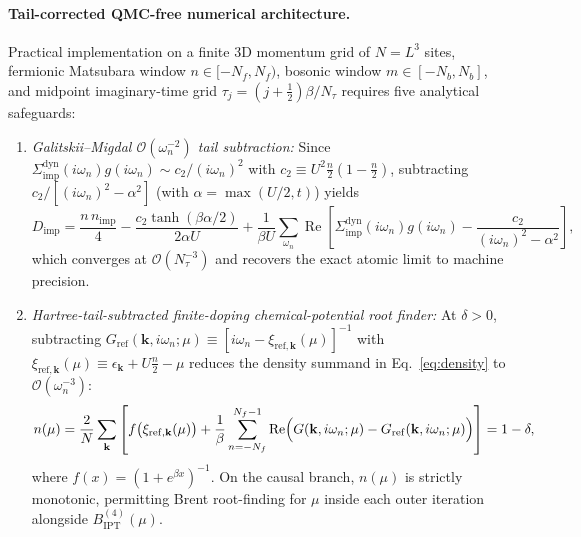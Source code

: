 \documentclass[11pt,a4paper]{article}
\numberwithin{equation}{section}
\theoremstyle{plain}
\theoremstyle{definition}
\providecommand{\vk}{\mathbf{k}}
\providecommand{\re}{\operatorname{Re}}
\begin{document}
\paragraph{Tail-corrected QMC-free numerical architecture.}
Practical implementation on a finite 3D momentum grid of $N = L^3$ sites, fermionic
Matsubara window $n \in [-N_f, N_f)$, bosonic window $m \in [-N_b, N_b]$, and midpoint
imaginary-time grid $\tau_j = (j + \frac{1}{2})\beta/N_\tau$ requires five analytical
safeguards:
\begin{enumerate}
    \item \emph{Galitskii--Migdal $\mathcal{O}(\omega_n^{-2})$ tail subtraction:} Since
    $\Sigma_{\mathrm{imp}}^{\mathrm{dyn}}(i\omega_n)g(i\omega_n) \sim c_2/(i\omega_n)^2$
    with $c_2 \equiv U^2 \frac{n}{2}(1 - \frac{n}{2})$, subtracting
    $c_2/[(i\omega_n)^2 - \alpha^2]$ (with $\alpha = \max(U/2, t)$) yields
    \begin{equation}
        D_{\mathrm{imp}}
        = \frac{n\, n_{\mathrm{imp}}}{4} - \frac{c_2\tanh(\beta\alpha/2)}{2\alpha U}
          + \frac{1}{\beta U}\sum_{\omega_n} \re\!\left[
            \Sigma_{\mathrm{imp}}^{\mathrm{dyn}}(i\omega_n)g(i\omega_n)
            - \frac{c_2}{(i\omega_n)^2 - \alpha^2}
            \right],
        \label{eq:GM_tail}
    \end{equation}
    which converges at $\mathcal{O}(N_\tau^{-3})$ and recovers the exact atomic limit
    to machine precision.

    \item \emph{Hartree-tail-subtracted finite-doping chemical-potential root finder:}
    At $\delta > 0$, subtracting $G_{\mathrm{ref}}(\vk,i\omega_n;\mu) \equiv [i\omega_n - \xi_{\mathrm{ref},\vk}(\mu)]^{-1}$
    with $\xi_{\mathrm{ref},\vk}(\mu) \equiv \epsilon_{\vk} + U\frac{n}{2} - \mu$ reduces
    the density summand in Eq.~\eqref{eq:density} to $\mathcal{O}(\omega_n^{-3})$:
    \begin{equation}
        n(\mu) = \frac{2}{N}\sum_{\vk}\left[
            f\bigl(\xi_{\mathrm{ref},\vk}(\mu)\bigr)
            + \frac{1}{\beta}\sum_{n=-N_f}^{N_f-1}
              \re\Bigl(G(\vk,i\omega_n;\mu) - G_{\mathrm{ref}}(\vk,i\omega_n;\mu)\Bigr)
        \right] = 1 - \delta,
        \label{eq:mu_root}
    \end{equation}
    where $f(x) = (1 + e^{\beta x})^{-1}$. On the causal branch, $n(\mu)$ is strictly
    monotonic, permitting Brent root-finding for $\mu$ inside each outer iteration
    alongside $B_{\mathrm{IPT}}^{(4)}(\mu)$.


\end{enumerate}
\end{document}
